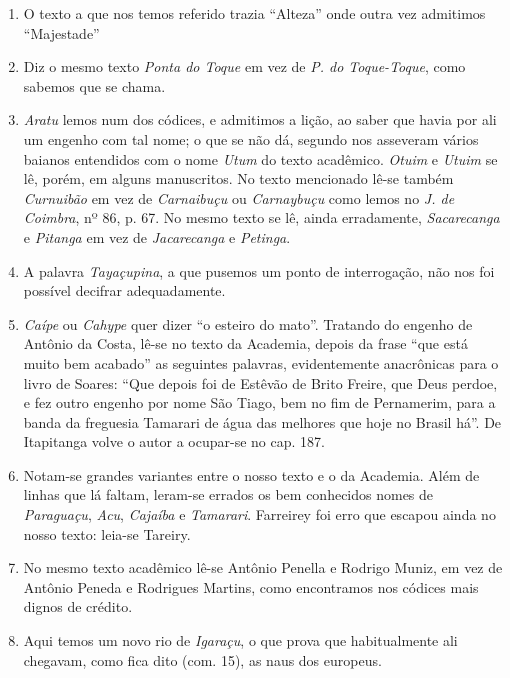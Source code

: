 \begin{enumerate}
\item O texto a que nos temos referido trazia ``Alteza'' onde outra vez admitimos ``Majestade'' 

\item Diz o mesmo texto \textit{Ponta do Toque}  em vez de \textit{P. do Toque-Toque}, como 
sabemos que se chama.

\item \textit{Aratu} lemos num dos códices, e admitimos a lição, ao saber que havia por ali um 
engenho com tal nome; o que se não dá, segundo nos asseveram vários baianos 
entendidos com o nome \textit{Utum} do texto acadêmico. \textit{Otuim} e \textit{Utuim} se lê, porém, 
em alguns manuscritos. No texto mencionado lê-se também \textit{Curnuibão} em vez de 
\textit{Carnaibuçu} ou \textit{Carnaybuçu}  como lemos no \textit{J. de Coimbra}, nº 86, p. 67.
No mesmo texto se lê, ainda erradamente, \textit{Sacarecanga} e \textit{Pitanga} em vez de \textit{Jacarecanga} 
e \textit{Petinga}.

\item A palavra \textit{Tayaçupina}, a que pusemos um ponto de interrogação, não  nos foi 
possível decifrar adequadamente.

\item \textit{Caípe} ou \textit{Cahype} quer dizer ``o esteiro do mato''.  Tratando do engenho de Antônio da 
Costa, lê-se no texto da Academia, depois da frase ``que está muito bem acabado''  as 
seguintes palavras, evidentemente anacrônicas para o livro de Soares: ``Que depois 
foi de Estêvão de Brito Freire, que Deus perdoe, e fez 
outro engenho por nome São Tiago, bem no fim de Pernamerim, para a banda da freguesia 
Tamarari de água das melhores que hoje no Brasil há''.  De Itapitanga volve o autor a 
ocupar-se no cap. 187.

\item  Notam-se grandes variantes entre o nosso texto e o da Academia.
Além de linhas que lá faltam, leram-se errados os bem conhecidos nomes
de \textit{Paraguaçu}, \textit{Acu}, \textit{Cajaíba} e \textit{Tamarari}. Farreirey foi erro que escapou
ainda no nosso texto: leia-se Tareiry.

\item No mesmo texto acadêmico lê-se Antônio Penella e Rodrigo Muniz, em vez de 
Antônio Peneda e Rodrigues Martins, como encontramos nos códices mais dignos de 
crédito.

\item Aqui temos um novo rio de \textit{Igaraçu}, o que prova que habitualmente ali 
chegavam, como fica dito (com. 15), as naus dos europeus.


\end{enumerate}
